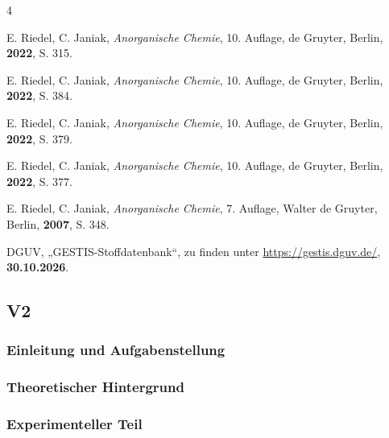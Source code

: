 \documentclass[
	a4paper,										%
	12pt,											%
	twoside,										%
	headsepline,								%
	footsepline,									%
	captions=tableheading,					%
]{scrartcl}
\begin{document}
\begin{thebibliography}{4} %

						{E. Riedel, C. Janiak}, 
			\textit	{Anorganische Chemie}, 
						{10. Auflage}, 
						{de Gruyter}, 
						{Berlin}, 
			\textbf	{2022}, 
			S.			{315}.

						{E. Riedel, C. Janiak}, 
			\textit	{Anorganische Chemie}, 
						{10. Auflage}, 
						{de Gruyter}, 
						{Berlin}, 
			\textbf	{2022}, 
			S.			{384}.

						{E. Riedel, C. Janiak}, 
			\textit	{Anorganische Chemie}, 
						{10. Auflage}, 
						{de Gruyter}, 
						{Berlin}, 
			\textbf	{2022}, 
			S.			{379}.

						{E. Riedel, C. Janiak}, 
			\textit	{Anorganische Chemie}, 
						{10. Auflage}, 
						{de Gruyter}, 
						{Berlin}, 
			\textbf	{2022}, 
			S.			{377}.
	
						{E. Riedel, C. Janiak}, 
			\textit	{Anorganische Chemie}, 
						{7. Auflage}, 
						{Walter de Gruyter}, 
						{Berlin}, 
			\textbf	{2007}, 
			S.			{348}.

						{DGUV}, 
						„{GESTIS-Stoffdatenbank}“, zu finden unter 
			\url		{https://gestis.dguv.de/}, 
			\textbf	{30.10.2026}.

			
\end{thebibliography}

\newpage

\setcounter{subsection}{1}							%
\setcounter{secnumdepth}{4}
	
\subsection{V2}

\subsubsection{Einleitung und Aufgabenstellung}


\subsubsection{Theoretischer Hintergrund}


\subsubsection{Experimenteller Teil}
\end{document}
